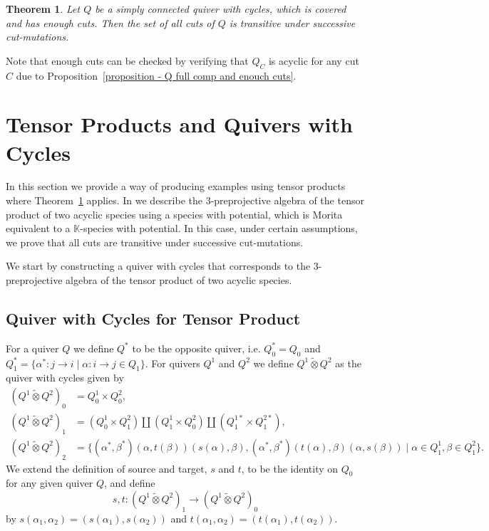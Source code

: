 \documentclass[a4paper, reqno]{amsart}
\newtheorem{mythm}{Theorem}[section]
\theoremstyle{definition}
\newcommand{\K}{\mathbb{K}}
\begin{document}
\begin{mythm}\label{theorem - simply con implies trans}
	Let $Q$ be a simply connected quiver with cycles, which is covered and has enough cuts. Then the set of all cuts of $Q$ is transitive under successive cut-mutations.
\end{mythm}

Note that enough cuts can be checked by verifying that $Q_C$ is acyclic for any cut $C$ due to Proposition~\ref{proposition - Q full comp and enouch cuts}.

\section{Tensor Products and Quivers with Cycles}\label{section - tensor products of quiver with cycles}
In this section we provide a way of producing examples using tensor products where Theorem~\ref{theorem - simply con implies trans} applies. In \cite{soderberg2024mutation} we describe the $3$-preprojective algebra of the tensor product of two acyclic species using a species with potential, which is Morita equivalent to a $\K$-species with potential. In this case, under certain assumptions, we prove that all cuts are transitive under successive cut-mutations.

We start by constructing a quiver with cycles that corresponds to the $3$-preprojective algebra of the tensor product of two acyclic species.

\subsection{Quiver with Cycles for Tensor Product}
For a quiver $Q$ we define $Q^*$ to be the opposite quiver, i.e. $Q^*_0 = Q_0$ and $Q_1^* = \{\alpha^*: j\to i \mid \alpha:i\to j\in Q_1\}$. For quivers $Q^1$ and $Q^2$ we define $Q^1\tilde{\otimes} Q^2$ as the quiver with cycles given by
\begin{equation*}
	\begin{aligned}
		(Q^1\tilde{\otimes} Q^2)_0 &= Q^1_0\times Q^2_0, \\
  		(Q^1\tilde{\otimes} Q^2)_1 &= (Q^1_0\times Q^2_1) \coprod (Q^1_1\times Q^2_0)\coprod (Q^{1*}_1\times Q^{2*}_1), \\
  		(Q^1\tilde{\otimes}Q^2)_2 &= \{(\alpha^*, \beta^*)(\alpha, t(\beta))(s(\alpha), \beta), (\alpha^*, \beta^*)(t(\alpha), \beta)(\alpha, s(\beta)) \mid \alpha\in Q^1_1, \beta\in Q^2_1 \}.
	\end{aligned}
\end{equation*}
We extend the definition of source and target, $s$ and $t$, to be the identity on $Q_0$ for any given quiver $Q$, and define
\begin{equation*}
	s, t: (Q^1\tilde{\otimes} Q^2)_1 \to (Q^1\tilde{\otimes} Q^2)_0
\end{equation*}
by $s(\alpha_1, \alpha_2) = (s(\alpha_1), s(\alpha_2))$ and $t(\alpha_1, \alpha_2) = (t(\alpha_1), t(\alpha_2))$.
\end{document}
